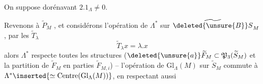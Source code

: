  On suppose dorénavant $2.1_\Lambda\ne0$.

Revenons à $\widetilde P_M$ , et considérons l'opération de $\Lambda^*$ sur $\widetilde{\deleted{\unsure{B}}S}_M$, par les $\widetilde T_\lambda$
\[
 \widetilde T_\lambda x=\lambda.x\tag*{(20)}
\]
alors $\Lambda^*$ respecte toutes les structures ($\deleted{\unsure{a}}\widetilde F_M\subset\mathfrak P_3(\widetilde S_M)$ et la partition de $\widetilde F_M$ en parties $\widetilde F_{M,i}$) -- l'opération de $\mathrm{Gl}_\Lambda(M)$ sur $\widetilde S_M$  commute à $\Lambda^*\inserted{\simeq\operatorname{Centre}(\mathrm{Gl}_\Lambda(M))}$, en respectant aussi
